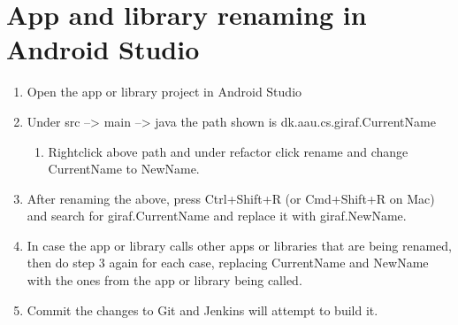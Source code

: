 \section{App and library renaming in Android Studio}
\begin{enumerate}
	\item Open the app or library project in Android Studio
	\item Under src --> main --> java the path shown is dk.aau.cs.giraf.CurrentName
	\begin{enumerate}
		\item Rightclick above path and under refactor click rename and change CurrentName to NewName.
	\end{enumerate}
	\item After renaming the above, press Ctrl+Shift+R (or Cmd+Shift+R on Mac) and search for giraf.CurrentName and replace it with giraf.NewName.
	\item In case the app or library calls other apps or libraries that are being renamed, then do step 3 again for each case, replacing CurrentName and NewName with the ones from the app or library being called.
	\item Commit the changes to Git and Jenkins will attempt to build it.
\end{enumerate}